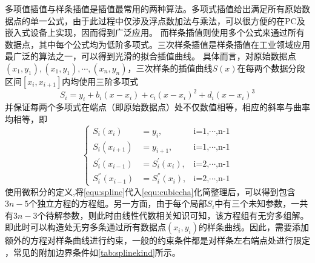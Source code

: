 多项值插值与样条插值是插值最常用的两种算法\cite{Timothy2018,Carl2008}。多项式插值给出满足所有原始数据点的单一公式，由于此过程中仅涉及浮点数加法与乘法，可以很方便的在PC及嵌入式设备上实现，因而得到广泛应用。
而样条插值则使用多个公式来通过所有数据点，其中每个公式均为低阶多项式。三次样条插值是样条插值在工业领域应用最广泛的算法之一，可以得到光滑的拟合插值曲线。
具体而言，对原始数据点$(x_1,y_1),(x_1,y_1),\cdots,(x_n,y_n)$，三次样条的插值曲线$S(x)$在每两个数据分段区间$[x_i,x_{i+1}]$内均使用三阶多项式
\begin{equation}
    \label{equ:spline}
    S_{i}=y_{i}+b_{i}(x-x_{i})+c_{i}{(x-x_{i})}^2+d_{i}{(x-x_{i})}^3
\end{equation}
并保证每两个多项式在端点（即原始数据点）处不仅数值相等，相应的斜率与曲率均相等，即
\begin{equation}
    \label{equ:cubiccha}
    \left \{
    \begin{aligned}
        S_{i}(x_{i})&=y_i,&\text{i=1,$\cdots$,n-1}\\
        S_{i}(x_{i+1})&=y_{i+1},&\text{i=1,$\cdots$,n-1}\\
        S_{i}^{'}(x_{i-1})&=S_{i}^{'}(x_{i}),&\text{i=2,$\cdots$,n-1} \\
        S_{i}^{''}(x_{i-1})&=S_{i}^{''}(x_{i}),&\text{i=2,$\cdots$,n-1}
    \end{aligned}
    \right.
\end{equation}
使用微积分的定义,将\autoref{equ:spline}代入\autoref{equ:cubiccha}化简整理后，可以得到包含$3n-5$个独立方程的方程组。另一方面，由于每个局部$S_i$中有三个未知参数，一共有$3n-3$个待解参数，则此时由线性代数相关知识可知，该方程组有无穷多组解。
即此时可以构造处无穷多条通过所有数据点$(x_i,y_i)$的样条曲线。因此，需要添加额外的方程对样条曲线进行约束，一般的约束条件都是对样条左右端点处进行限定 ，常见的附加边界条件如\autoref{tab:splinekind}所示\cite{Timothy2018}。
